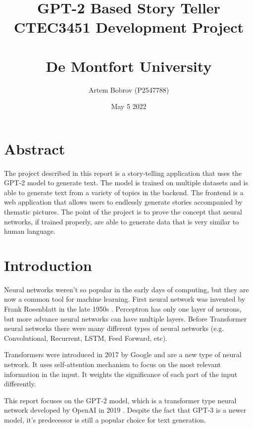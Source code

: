 \documentclass[12pt]{report}
\title{%
  GPT-2 Based Story Teller\\
  \large CTEC3451 Development Project \\~\\
    De Montfort University}
\author{Artem Bobrov (P2547788)}
\date{May 5 2022}
\begin{document}
\maketitle
\thispagestyle{empty}
\clearpage
\tableofcontents
\setcounter{tocdepth}{1}
\thispagestyle{empty}
\clearpage
\section*{Abstract}
\paragraph{}
The project described in this report is a story-telling application that uses the GPT-2 model to generate text. 
The model is trained on multiple datasets and is able to generate text from a variety of topics in the backend. 
The frontend is a web application that allows users to endlessly generate stories accompanied by thematic pictures.
The point of the project is to prove the concept that neural networks, if trained properly, are able to generate 
data that is very similar to human language.

\section*{Introduction}
\paragraph{}
Neural networks weren't so popular in the early days of computing, but they are now a common tool for machine learning.
First neural network was invented by Frank Rosenblatt in the late 1950s \citep{rosenblatt_1958_the}. Perceptron has only 
one layer of neurons, but more advance neural networks can have multiple layers. Before Transformer neural networks 
there were many different types of neural networks (e.g. Convolutional, Recurrent, LSTM, Feed Forward, etc).

Transformers were introduced in 2017 by Google \citep{attention_is_all_you_need} and are a new type of neural network. It uses self-attention mechanism 
to focus on the most relevant information in the input. It weights the significance of each part of the input differently.

This report focuses on the GPT-2 model, which is a transformer type neural network developed by OpenAI in 2019 \citep{radford_wu_child_luan_amodei_sutskever_2019}.
Despite the fact that GPT-3 is a newer model, it's predecessor is still a popular choice for text generation.
\end{document}
